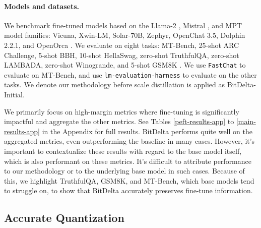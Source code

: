 \documentclass[numbers]{article}
\newcommand{\oursmethod}{BitDelta\xspace}
\begin{document}
\paragraph{Models and datasets. } We benchmark fine-tuned models based on the Llama-2 \citep{touvron2023llama}, Mistral \citep{jiang2023mistral}, and MPT \citep{mosaicmpt} model families: Vicuna, Xwin-LM, Solar-70B, Zephyr, OpenChat 3.5, Dolphin 2.2.1, and OpenOrca \cite{vicuna2023,xwin-lm,Solar70B,tunstall2023zephyr,wang2023openchat,Hartford2023,mukherjee2023orca}. We evaluate on eight tasks: MT-Bench, 25-shot ARC Challenge, 5-shot BBH, 10-shot HellaSwag, zero-shot TruthfulQA, zero-shot LAMBADA, zero-shot Winogrande, and 5-shot GSM8K \citep{zheng2023judging,clark2018think,suzgun2022challenging,zellers2019hellaswag,lin2022truthfulqa,paperno2016lambada,sakaguchi2019winogrande,cobbe2021training}. We use \texttt{FastChat} \citep{zheng2023judging} to evaluate on MT-Bench, and use \texttt{lm-evaluation-harness} \citep{eval-harness} to evaluate on the other tasks. We denote our methodology before scale distillation is applied as \oursmethod -Initial.

We primarily focus on high-margin metrics where fine-tuning is significantly impactful and aggregate the other metrics. See Tables \ref{peft-results-app} to \ref{main-results-app} in the Appendix for full results. \oursmethod performs quite well on the aggregated metrics, even outperforming the baseline in many cases. However, it's important to contextualize these results with regard to the base model itself, which is also performant on these metrics. It's difficult to attribute performance to our methodology or to the underlying base model in such cases. Because of this, we highlight TruthfulQA, GSM8K, and MT-Bench, which base models tend to struggle on, to show that \oursmethod accurately preserves fine-tune information.



\subsection{Accurate Quantization}
\label{sec:accuracy}
\end{document}
